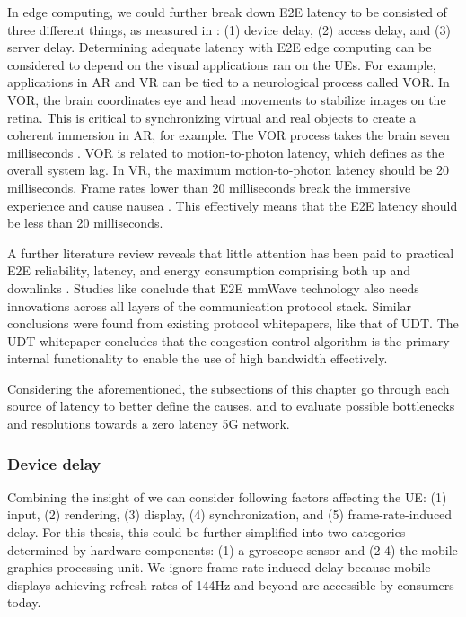 \documentclass[12pt]{article}
\begin{document}
In edge computing, we could further break down \gls{E2E} latency to be consisted of three different things, as measured in \cite{kamarainen2017measurement}: (1) device delay, (2) access delay, and (3) server delay. Determining adequate latency with \gls{E2E} edge computing can be considered to depend on the visual applications ran on the \glspl{UE}. For example, applications in \gls{AR} and \gls{VR} can be tied to a neurological process called \gls{VOR}. In \gls{VOR}, the brain coordinates eye and head movements to stabilize images on the retina. This is critical to synchronizing virtual and real objects to create a coherent immersion in \gls{AR}, for example. The \gls{VOR} process takes the brain seven milliseconds \cite{zheng2014minimizing}. \gls{VOR} is related to motion-to-photon latency, which \cite{anthes2016state} defines as the overall system lag. In VR, the maximum motion-to-photon latency should be 20 milliseconds. Frame rates lower than 20 milliseconds break the immersive experience and cause nausea \cite{anthes2016state}. This effectively means that the \gls{E2E} latency should be less than 20 milliseconds.

A further literature review reveals that little attention has been paid to practical \gls{E2E} reliability, latency, and energy consumption comprising both up and downlinks \cite{condoluci2016enabling}.  Studies like \cite{mezzavilla2018end} conclude that \gls{E2E} \gls{mmWave} technology also needs innovations across all layers of the communication protocol stack. Similar conclusions were found from existing protocol whitepapers, like that of \gls{UDT}. The \gls{UDT} whitepaper \cite{gu2007udt} concludes that the congestion control algorithm is the primary internal functionality to enable the use of high bandwidth effectively.

Considering the aforementioned, the subsections of this chapter go through each source of latency to better define the causes, and to evaluate possible bottlenecks and resolutions towards a zero latency \gls{5G} network.

\subsubsection{Device delay}

Combining the insight of \cite{kamarainen2017measurement, jacobs1997managing} we can consider following factors affecting the \gls{UE}: (1) input, (2) rendering, (3) display, (4) synchronization, and (5) frame-rate-induced delay. For this thesis, this could be further simplified into two categories determined by hardware components: (1) a gyroscope sensor and (2-4) the mobile graphics processing unit. We ignore frame-rate-induced delay because mobile displays achieving refresh rates of 144Hz and beyond are accessible by consumers today.
\end{document}

